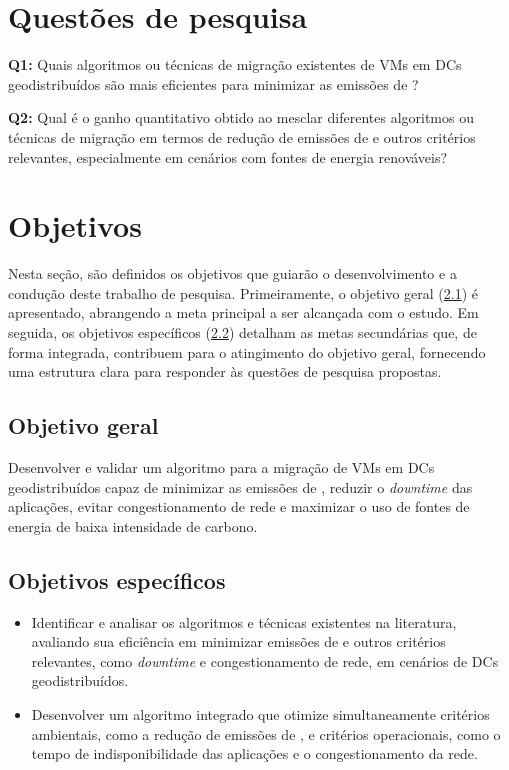\documentclass[
	12pt,				%
	oneside,			%
	a4paper,			%
	english,			%
	brazil				%
	]{abntex2ppgsi}
\begin{document}
\section{Questões de pesquisa}
\textbf{Q1:} Quais algoritmos ou técnicas de migração existentes de VMs em DCs geodistribuídos são mais eficientes para minimizar as emissões de ?

\textbf{Q2:} Qual é o ganho quantitativo obtido ao mesclar diferentes algoritmos ou técnicas de migração em termos de redução de emissões de  e outros critérios relevantes, especialmente em cenários com fontes de energia renováveis?

\section{Objetivos}
Nesta seção, são definidos os objetivos que guiarão o desenvolvimento e a condução deste trabalho de pesquisa. Primeiramente, o objetivo geral (\ref{subsection:objetivo-geral}) é apresentado, abrangendo a meta principal a ser alcançada com o estudo. Em seguida, os objetivos específicos (\ref{subsection:objetivos-especificos}) detalham as metas secundárias que, de forma integrada, contribuem para o atingimento do objetivo geral, fornecendo uma estrutura clara para responder às questões de pesquisa propostas.

\subsection{Objetivo geral}\label{subsection:objetivo-geral}
Desenvolver e validar um algoritmo para a migração de VMs em DCs geodistribuídos capaz de minimizar as emissões de , reduzir o \textit{downtime} das aplicações, evitar congestionamento de rede e maximizar o uso de fontes de energia de baixa intensidade de carbono.

\subsection{Objetivos específicos}\label{subsection:objetivos-especificos}
\begin{itemize}
	\item Identificar e analisar os algoritmos e técnicas existentes na literatura, avaliando sua eficiência em minimizar emissões de  e outros critérios relevantes, como \textit{downtime} e congestionamento de rede, em cenários de DCs geodistribuídos.
	\item Desenvolver um algoritmo integrado que otimize simultaneamente critérios ambientais, como a redução de emissões de , e critérios operacionais, como o tempo de indisponibilidade das aplicações e o congestionamento da rede.
\end{itemize}
\end{document}
